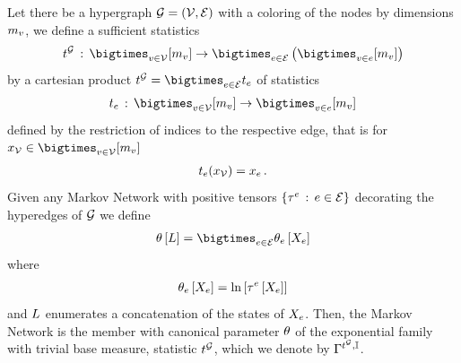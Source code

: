 \begin{theorem}
    \label{the:markovNetworkExponentialFamilies}
    Let there be a hypergraph $\mathcal{G}=(\mathcal{V},\mathcal{E})$ with a coloring of the nodes by dimensions $m_{v}$, we define a sufficient statistics
    \begin{align*}
        \sstatof{\graph} \defcols \bigtimes_{\node\in\nodes} [\catdimof{\node}] \rightarrow \bigtimes_{\edgein}\left(\bigtimes_{\node\in\edge}[\catdimof{\node}]\right)
    \end{align*}
    by a cartesian product $\sstatof{\graph} = \bigtimes_{\edgein} \sstatcoordinateof{\edge}$ of statistics
    \begin{align*}
        \sstatcoordinateof{\edge} \defcols \bigtimes_{\node\in\nodes} [\catdimof{\node}] \rightarrow \bigtimes_{\node\in\edge} [\catdimof{\node}]
    \end{align*}
    defined by the restriction of indices to the respective edge, that is for $\catindexof{\nodes}\in\nodestatesof{\nodes}$
    \begin{align*}
        t_{e}(x_{\mathcal{V}}) = x_{e} \, .
    \end{align*}
    Given any Markov Network with positive tensors $\{\tau^{e}\,:\,e\in\mathcal{E}\}$ decorating the hyperedges of $\mathcal{G}$ we define
    \begin{align*}
        \canparamat{\selvariable} = \bigtimes_{\edgein} \canparamofat{\edge}{\catvariableof{\edge}}
    \end{align*}
    where
    \begin{align*}
        \theta_{e}\left[X_{e}\right] =  \ln \left[ \tau^{e}\left[X_{e}\right] \right]
    \end{align*}
    and $L$ enumerates a concatenation of the states of $X_{e}$.
    Then, the Markov Network is the member with canonical parameter $\theta$ of the exponential family with trivial base measure, statistic $t^{\mathcal{G}}$, which we denote by $\Gamma^{t^{\mathcal{G}},\mathbb{I}}$.
\end{theorem}
